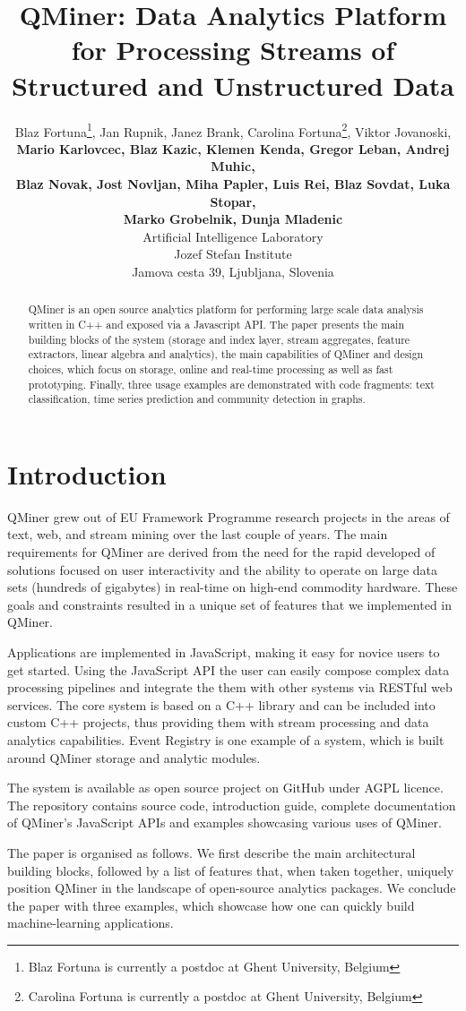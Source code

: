 \documentclass{article} %
\title{QMiner: Data Analytics Platform for Processing Streams of Structured and Unstructured Data}
\author{
Blaz Fortuna\thanks{Blaz Fortuna is currently a postdoc at Ghent University, Belgium}, Jan Rupnik, Janez Brank, Carolina Fortuna\thanks{Carolina Fortuna is currently a postdoc at Ghent University, Belgium}, Viktor Jovanoski, \\
\textbf{Mario Karlovcec, Blaz Kazic, Klemen Kenda, Gregor Leban, Andrej Muhic,} \\
\textbf{Blaz Novak, Jost Novljan, Miha Papler, Luis Rei, Blaz Sovdat, Luka Stopar,} \\
\textbf{Marko Grobelnik, Dunja Mladenic} \\
Artificial Intelligence Laboratory \\
Jozef Stefan Institute \\
Jamova cesta 39, Ljubljana, Slovenia \\
}
\begin{document}
\maketitle

\begin{abstract}
QMiner is an open source analytics platform for performing large scale data analysis written in C++ and exposed via a Javascript API. The paper presents the main building blocks of the system (storage and index layer, stream aggregates, feature extractors, linear algebra and analytics), the main capabilities of QMiner and design choices, which focus on storage, online and real-time processing as well as fast prototyping. Finally, three usage examples are demonstrated with code fragments: text classification, time series prediction and community detection in graphs.\end{abstract}

\section{Introduction}
QMiner grew out of EU Framework Programme research projects in the areas of text, web, and stream mining over the last couple of years. The main requirements for QMiner are derived from the need for the rapid developed of solutions focused on user interactivity and the ability to operate on large data sets (hundreds of gigabytes) in real-time on high-end commodity hardware. These goals and constraints resulted in a unique set of features that we implemented in QMiner.

Applications are implemented in JavaScript, making it easy for novice users to get started. Using the JavaScript API the user can easily compose complex data processing pipelines and integrate the them with other systems via RESTful web services. The core system is based on a C++ library and can be included into custom C++ projects, thus providing them with stream processing and data analytics capabilities. Event Registry\cite{eventRegistry} is one example of a system, which is built around QMiner storage and analytic modules.

The system is available as open source project on GitHub under AGPL licence. The repository contains source code, introduction guide, complete documentation of QMiner's JavaScript APIs and examples showcasing various uses of QMiner.

The paper is organised as follows. We first describe the main architectural building blocks, followed by a list of features that, when taken together, uniquely position QMiner in the landscape of open-source analytics packages. We conclude the paper with three examples, which showcase how one can quickly build machine-learning applications.
\end{document}
